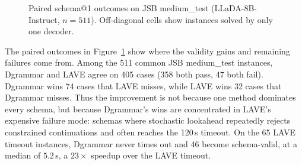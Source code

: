 \documentclass[11pt]{article}
\begin{document}
\begin{figure}[!t]
\centering
{}
\caption{Paired schema@1 outcomes on JSB medium\_test (LLaDA-8B-Instruct, $n{=}511$). Off-diagonal cells show instances solved by only one decoder.}
\label{fig:failure-breakdown}
\end{figure}

The paired outcomes in Figure~\ref{fig:failure-breakdown} show where the validity gains and remaining failures come from. Among the 511 common JSB medium\_test instances, Dgrammar and LAVE agree on 405 cases (358 both pass, 47 both fail). Dgrammar wins 74 cases that LAVE misses, while LAVE wins 32 cases that Dgrammar misses. Thus the improvement is not because one method dominates every schema, but because Dgrammar's wins are concentrated in LAVE's expensive failure mode: schemas where stochastic lookahead repeatedly rejects constrained continuations and often reaches the 120\,s timeout. On the 65 LAVE timeout instances, Dgrammar never times out and 46 become schema-valid, at a median of $5.2$\,s, a $23\times$ speedup over the LAVE timeout.
\end{document}
